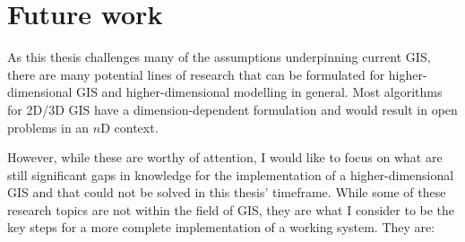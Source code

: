 \section{Future work}
\label{se:futurework}

As this thesis challenges many of the assumptions underpinning current GIS, there are many potential lines of research that can be formulated for higher-dimensional GIS and higher-dimensional modelling in general.
Most algorithms for 2D/3D GIS have a dimension-dependent formulation and would result in open problems in an $n$D context.

However, while these are worthy of attention, I would like to focus on what are still significant gaps in knowledge for the implementation of a higher-dimensional GIS and that could not be solved in this thesis' timeframe.
While some of these research topics are not within the field of GIS, they are what I consider to be the key steps for a more complete implementation of a working system.
They are:


